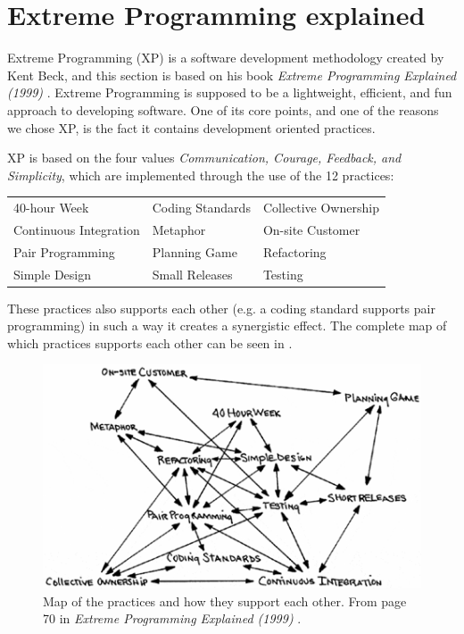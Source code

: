 \section{Extreme Programming explained}
Extreme Programming (XP) is a software development methodology created by Kent Beck, and this section is based on his book \textit{Extreme Programming Explained (1999)} \citep{xp:explained}. 
Extreme Programming is supposed to be a lightweight, efficient, and fun approach to developing software.
One of its core points, and one of the reasons we chose XP, is the fact it contains development oriented practices.

\noindent XP is based on the four values \textit{Communication, Courage, Feedback, and Simplicity}, which are implemented through the use of the 12 practices:

\begin{tabularx}{\textwidth}{X X X}
	40-hour Week				 & Coding Standards & Collective Ownership \\
	Continuous Integration	  & Metaphor         	 & On-site Customer     \\
	Pair Programming			& Planning Game		& Refactoring          \\
	Simple Design          		  & Small Releases   	& Testing             
\end{tabularx}

These practices also supports each other (e.g. a coding standard supports pair programming) in such a way it creates a synergistic effect.
The complete map of which practices supports each other can be seen in .
\begin{figure}[H]
	\centering
	\includegraphics[]{Images/xpPracticeSupport.png}
		\caption{Map of the practices and how they support each other.
			From page 70 in \textit{Extreme Programming Explained (1999)} \citep{xp:explained}. }
	\label{fig:practiceSupport}
\end{figure}


